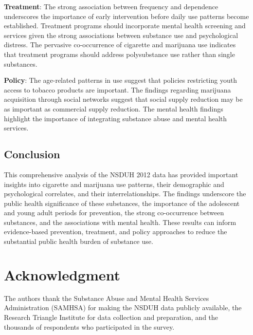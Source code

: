 \documentclass[conference]{IEEEtran}
\begin{document}
\textbf{Treatment}: The strong association between frequency and dependence underscores the importance of early intervention before daily use patterns become established. Treatment programs should incorporate mental health screening and services given the strong associations between substance use and psychological distress. The pervasive co-occurrence of cigarette and marijuana use indicates that treatment programs should address polysubstance use rather than single substances.

\textbf{Policy}: The age-related patterns in use suggest that policies restricting youth access to tobacco products are important. The findings regarding marijuana acquisition through social networks suggest that social supply reduction may be as important as commercial supply reduction. The mental health findings highlight the importance of integrating substance abuse and mental health services.

\subsection{Conclusion}

This comprehensive analysis of the NSDUH 2012 data has provided important insights into cigarette and marijuana use patterns, their demographic and psychological correlates, and their interrelationships. The findings underscore the public health significance of these substances, the importance of the adolescent and young adult periods for prevention, the strong co-occurrence between substances, and the associations with mental health. These results can inform evidence-based prevention, treatment, and policy approaches to reduce the substantial public health burden of substance use.

\section*{Acknowledgment}

The authors thank the Substance Abuse and Mental Health Services Administration (SAMHSA) for making the NSDUH data publicly available, the Research Triangle Institute for data collection and preparation, and the thousands of respondents who participated in the survey.
\end{document}

